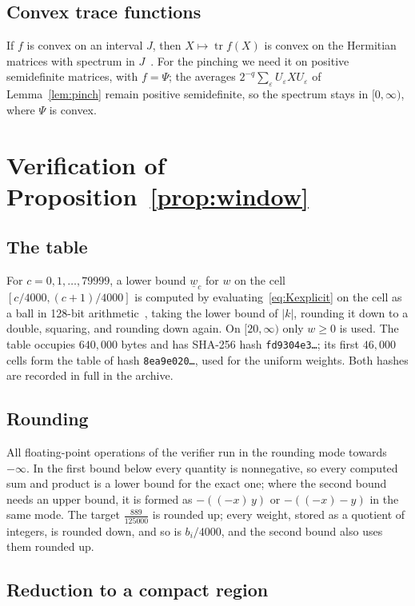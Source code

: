 \documentclass[aps,prd,twocolumn,superscriptaddress,nofootinbib,longbibliography,floatfix,showkeys,amsmath,amssymb,10pt]{revtex4-2}
\theoremstyle{definition}
\theoremstyle{remark}
\DeclareMathOperator{\tr}{tr}
\begin{document}
\subsection{Convex trace functions}

If $f$ is convex on an interval $J$, then $X\mapsto\tr f(X)$ is convex on
the Hermitian matrices with spectrum in $J$~\cite[Theorem V.2.5]{Bha97}.
For the pinching we need it on positive semidefinite matrices, with
$f=\Psi$; the averages $2^{-q}\sum_\varepsilon U_\varepsilon XU_\varepsilon$
of Lemma~\ref{lem:pinch} remain positive semidefinite, so the spectrum stays
in $[0,\infty)$, where $\Psi$ is convex.

\section{Verification of Proposition~\ref{prop:window}}\label{app:verify}

\subsection{The table}

For $c=0,1,\dots,79999$, a lower bound $\underline w_c$ for $w$ on the cell
$[c/4000,(c+1)/4000]$ is computed by evaluating~\eqref{eq:Kexplicit} on the
cell as a ball in 128-bit arithmetic~\cite{Joh17}, taking the lower bound of
$|k|$, rounding it down to a double, squaring, and rounding down again. On
$[20,\infty)$ only $w\ge0$ is used. The table occupies $640{,}000$ bytes
and has SHA-256 hash \texttt{fd9304e3\ldots}; its first $46{,}000$ cells
form the table of hash \texttt{8ea9e020\ldots}, used for the uniform
weights. Both hashes are recorded in full in the archive.

\subsection{Rounding}

All floating-point operations of the verifier run in the rounding mode
towards $-\infty$. In the first bound below every quantity is nonnegative,
so every computed sum and product is a lower bound for the exact one; where
the second bound needs an upper bound, it is formed as $-((-x)\,y)$ or
$-((-x)-y)$ in the same mode. The target $\frac{889}{125000}$ is rounded
up; every weight, stored as a quotient of integers, is rounded down, and so
is $b_i/4000$, and the second bound also uses them rounded up.

\subsection{Reduction to a compact region}
\end{document}

